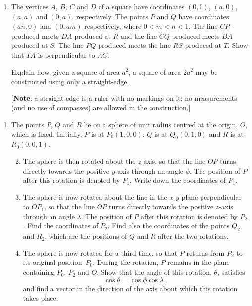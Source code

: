 \documentclass[a4, 11pt]{report}
\newlength{\qspace}
\newcounter{qnumber}
\newenvironment{question}%
 {\vspace{\qspace}
  \begin{enumerate}[\bfseries 1\quad][10]%
    \setcounter{enumi}{\value{qnumber}}%
    \item%
 }
{
  \end{enumerate}
  \filbreak
  \stepcounter{qnumber}
 }
\newenvironment{questionparts}[1][1]%
 {
  \begin{enumerate}[\bfseries (i)]%
    \setcounter{enumii}{#1}
    \addtocounter{enumii}{-1}
    \setlength{\itemsep}{5mm}
    \setlength{\parskip}{8pt}
 }
 {
  \end{enumerate}
 }
\begin{document}
\begin{question}
The vertices $A$, $B$, $C$ and $D$ of a square have coordinates
$(0,0)$, $(a,0)$, $(a,a)$ and $(0,a)$, respectively.
The points $P$ and $Q$ have coordinates $(an,0)$ and $(0,am)$ respectively, 
where $0<m<n<1$.  
The line $CP$ produced
meets $DA$ produced at $R$ and the line $CQ$ produced meets $BA$ produced
at $S$.  The line $PQ$ produced meets the line $RS$ produced at $T$.
Show that $TA$ is perpendicular to $AC$.

Explain how, given a square of area $a^2$, a square of area $2a^2$ may
be constructed using only a straight-edge.
 
[{\bf Note}: a straight-edge is a ruler with no markings on it;
no measurements (and no use of  compasses) are allowed in the construction.]

	\end{question}
	
\begin{question}
The points $P$, $Q$ and  $R$ 
lie on a sphere of unit radius centred at the origin, $O$,
which is fixed. 
Initially, $P$ is at $P_0(1, 0, 0)$, $Q$ is at $Q_0(0, 1, 0)$ 
and $R$ is at
$R_0(0, 0, 1)$. 

\begin{questionparts}
\item
The sphere is then rotated about the $z$-axis,
so that the line $OP$ turns directly
towards the positive 
$y$-axis through an angle $\phi$. The position of $P$ after this
rotation is denoted by $P_1$.
Write down the coordinates of $P_1$. 

\item
The sphere is now rotated about the line in the $x$-$y$ plane 
perpendicular to $OP_1$, so that the line $OP$
turns directly towards the positive $z$-axis through an angle $\lambda$. 
The position of $P$
after this rotation is denoted by $P_2$.
Find the coordinates of $P_2$. 
 Find also
the coordinates of the points $Q_2$ and $R_2$, which are
the positions of $Q$ and $R$ after
the two rotations.
\item                  
The sphere is now  rotated for a third time,
 so that $P$ returns from $P_2$ to its
original position~$P_0$. During the rotation, $P$ remains in the 
plane containing $P_0$, $P_2$ and $O$.
Show that the  angle of this
rotation, $\theta$, satisfies 
\[
\cos\theta  = \cos\phi  \cos\lambda\,,
\]
and find a vector in the direction of the axis 
about which this rotation takes place.
\end{questionparts}
\end{question}
	
\end{document}
